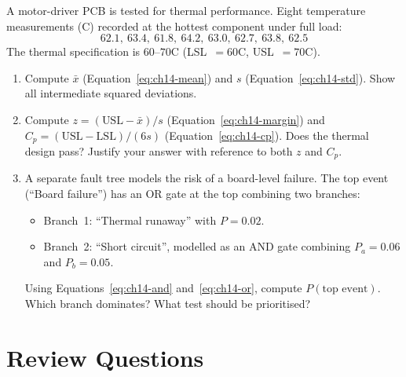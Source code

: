 A motor-driver PCB is tested for thermal performance.
Eight temperature measurements (\textdegree C) recorded at the hottest component under
full load:
\[
  62.1,\ 63.4,\ 61.8,\ 64.2,\ 63.0,\ 62.7,\ 63.8,\ 62.5
\]
The thermal specification is $60\text{--}70$\textdegree C (\textrm{LSL}~$= 60$\textdegree C,
\textrm{USL}~$= 70$\textdegree C).

\begin{enumerate}
  \item[(a)] Compute $\bar{x}$ (Equation~\ref{eq:ch14-mean}) and $s$
             (Equation~\ref{eq:ch14-std}).
             Show all intermediate squared deviations.
  \item[(b)] Compute $z = (\text{USL} - \bar{x})/s$ (Equation~\ref{eq:ch14-margin})
             and $C_p = (\text{USL}-\text{LSL})/(6s)$ (Equation~\ref{eq:ch14-cp}).
             Does the thermal design pass?
             Justify your answer with reference to both $z$ and $C_p$.
  \item[(c)] A separate fault tree models the risk of a board-level failure.
             The top event (``Board failure'') has an OR gate at the top combining
             two branches:
             \begin{itemize}
               \item Branch~1: ``Thermal runaway'' with $P = 0.02$.
               \item Branch~2: ``Short circuit'', modelled as an AND gate combining
                     $P_a = 0.06$ and $P_b = 0.05$.
             \end{itemize}
             Using Equations~\ref{eq:ch14-and} and~\ref{eq:ch14-or}, compute
             $P(\text{top event})$.
             Which branch dominates?
             What test should be prioritised?
\end{enumerate}

\section*{Review Questions}
\label{sec:ch14-review}

